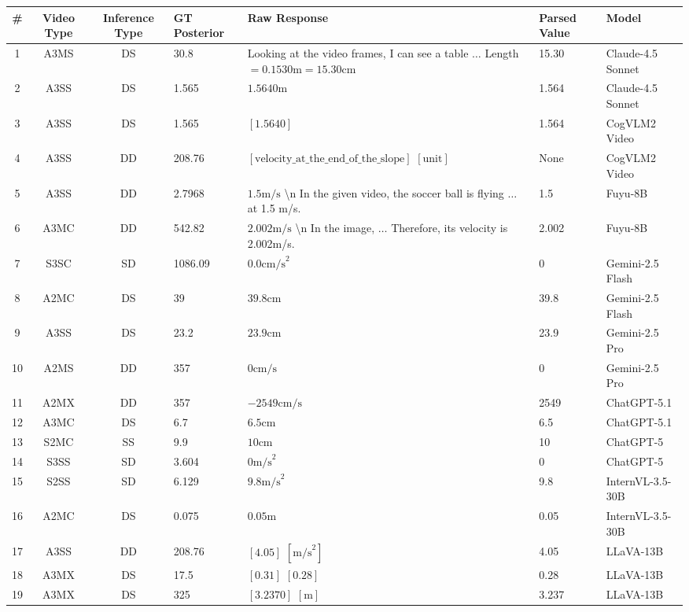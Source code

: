\begin{tabular}{@{} c c c C{2.0cm} L{5.0cm} C{1.4cm} L{3.2cm} @{}}
\toprule
\textbf{\#} & \textbf{Video Type} & \textbf{Inference Type} & \textbf{GT Posterior} & \textbf{Raw Response} & \textbf{Parsed Value} & \textbf{Model} \\
 & A3MS & DS & 30.8 & Looking at the video frames, I can see a table $\dots$ Length $= 0.1530\text{m} = 15.30\text{cm}$ & 15.30 & Claude-4.5 Sonnet \\
2 & A3SS & DS & 1.565 & $1.5640 \text{m}$ & 1.564 & Claude-4.5 Sonnet \\
3 & A3SS & DS & 1.565 & $[1.5640]$ & 1.564 & CogVLM2 Video \\
4 & A3SS & DD & 208.76 & $[\text{velocity\_at\_the\_end\_of\_the\_slope}]$ $[\text{unit}]$ & None & CogVLM2 Video \\
5 & A3SS & DD & 2.7968 & $1.5 \text{m/s}$ \textbackslash n In the given video, the soccer ball is flying $\dots$ at 1.5 m/s. & 1.5 & Fuyu-8B \\
6 & A3MC & DD & 542.82 & $2.002\text{m/s}$ \textbackslash n In the image, $\dots$ Therefore, its velocity is 2.002m/s. & 2.002 & Fuyu-8B \\
7 & S3SC & SD & 1086.09 & $0.0 \text{cm/s}^2$ & 0 & Gemini-2.5 Flash \\
8 & A2MC & DS & 39 & $39.8 \text{cm}$ & 39.8 & Gemini-2.5 Flash \\
9 & A3SS & DS & 23.2 & $23.9 \text{cm}$ & 23.9 & Gemini-2.5 Pro \\
10 & A2MS & DD & 357 & $0 \text{cm/s}$ & 0 & Gemini-2.5 Pro \\
11 & A2MX & DD & 357 & $-2549 \text{cm/s}$ & 2549 & ChatGPT-5.1 \\
12 & A3MC & DS & 6.7 & $6.5 \text{cm}$ & 6.5 & ChatGPT-5.1 \\
13 & S2MC & SS & 9.9 & $10 \text{cm}$ & 10 & ChatGPT-5 \\
14 & S3SS & SD & 3.604 & $0 \text{m/s}^2$ & 0 & ChatGPT-5 \\
15 & S2SS & SD & 6.129 & $9.8 \text{m/s}^2$ & 9.8 & InternVL-3.5-30B \\
16 & A2MC & DS & 0.075 & $0.05 \text{m}$ & 0.05 & InternVL-3.5-30B \\
17 & A3SS & DD & 208.76 & $[4.05]$ $[\text{m/s}^2]$ & 4.05 & LLaVA-13B \\
18 & A3MX & DS & 17.5 & $[0.31]$ $[0.28]$ & 0.28 & LLaVA-13B \\
19 & A3MX & DS & 325 & $[3.2370]$ $[\text{m}]$ & 3.237 & LLaVA-13B \\

\end{tabular}
